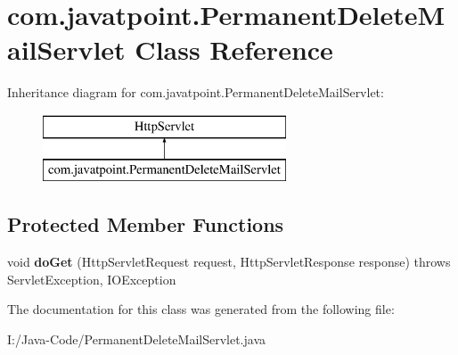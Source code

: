 \hypertarget{classcom_1_1javatpoint_1_1_permanent_delete_mail_servlet}{}\section{com.\+javatpoint.\+Permanent\+Delete\+Mail\+Servlet Class Reference}
\label{classcom_1_1javatpoint_1_1_permanent_delete_mail_servlet}
Inheritance diagram for com.\+javatpoint.\+Permanent\+Delete\+Mail\+Servlet\+:\begin{figure}[H]
\begin{center}
\leavevmode
\includegraphics[height=2.000000cm]{classcom_1_1javatpoint_1_1_permanent_delete_mail_servlet}
\end{center}
\end{figure}
\subsection*{Protected Member Functions}
\begin{DoxyCompactItemize}
\item 
\mbox{\label{classcom_1_1javatpoint_1_1_permanent_delete_mail_servlet_a2bdd76fbdec771c142b2edc86385b65a}} 
void {\bfseries do\+Get} (Http\+Servlet\+Request request, Http\+Servlet\+Response response)  throws Servlet\+Exception, I\+O\+Exception 
\end{DoxyCompactItemize}


The documentation for this class was generated from the following file\+:\begin{DoxyCompactItemize}
\item 
I\+:/\+Java-\/\+Code/Permanent\+Delete\+Mail\+Servlet.\+java\end{DoxyCompactItemize}
